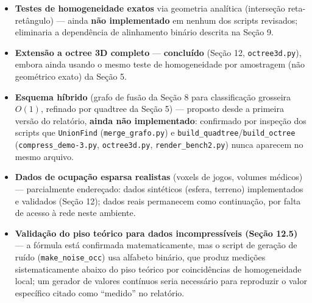 \documentclass[11pt,a4paper]{article}
\begin{document}
\begin{itemize}
  \item \textbf{Testes de homogeneidade exatos} via geometria analítica (interseção reta-retângulo) --- ainda \textbf{não implementado} em nenhum dos scripts revisados; eliminaria a dependência de alinhamento binário descrita na Seção 9.
  \item \textbf{Extensão a octree 3D completo} --- \textbf{concluído} (Seção 12, \texttt{octree3d.py}), embora ainda usando o mesmo teste de homogeneidade por amostragem (não geométrico exato) da Seção 5.
  \item \textbf{Esquema híbrido} (grafo de fusão da Seção 8 para classificação grosseira $O(1)$, refinado por quadtree da Seção 5) --- proposto desde a primeira versão do relatório, \textbf{ainda não implementado}: confirmado por inspeção dos scripts que \texttt{UnionFind} (\texttt{merge\_grafo.py}) e \texttt{build\_quadtree}/\texttt{build\_octree} (\texttt{compress\_demo-3.py}, \texttt{octree3d.py}, \texttt{render\_bench2.py}) nunca aparecem no mesmo arquivo.
  \item \textbf{Dados de ocupação esparsa realistas} (voxels de jogos, volumes médicos) --- parcialmente endereçado: dados sintéticos (esfera, terreno) implementados e validados (Seção 12); dados reais permanecem como continuação, por falta de acesso à rede neste ambiente.
  \item \textbf{Validação do piso teórico para dados incompressíveis (Seção 12.5)} --- a fórmula está confirmada matematicamente, mas o script de geração de ruído (\texttt{make\_noise\_occ}) usa alfabeto binário, que produz medições sistematicamente abaixo do piso teórico por coincidências de homogeneidade local; um gerador de valores contínuos seria necessário para reproduzir o valor específico citado como ``medido'' no relatório.
\end{itemize}
\end{document}

